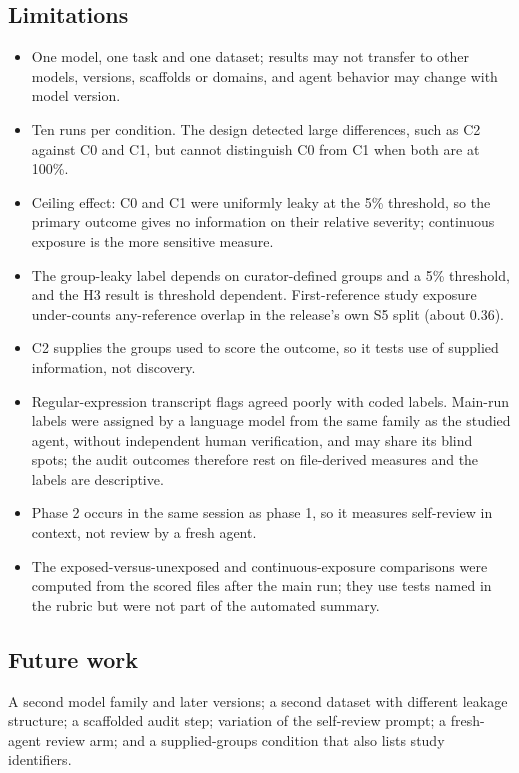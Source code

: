 \documentclass[11pt,a4paper]{article}
\begin{document}
\subsection*{Limitations}
\begin{itemize}
\item One model, one task and one dataset; results may not transfer to other models, versions, scaffolds or domains, and agent behavior may change with model version.
\item Ten runs per condition. The design detected large differences, such as C2 against C0 and C1, but cannot distinguish C0 from C1 when both are at 100\%.
\item Ceiling effect: C0 and C1 were uniformly leaky at the 5\% threshold, so the primary outcome gives no information on their relative severity; continuous exposure is the more sensitive measure.
\item The group-leaky label depends on curator-defined groups and a 5\% threshold, and the H3 result is threshold dependent. First-reference study exposure under-counts any-reference overlap in the release's own S5 split (about 0.36).
\item C2 supplies the groups used to score the outcome, so it tests use of supplied information, not discovery.
\item Regular-expression transcript flags agreed poorly with coded labels. Main-run labels were assigned by a language model from the same family as the studied agent, without independent human verification, and may share its blind spots; the audit outcomes therefore rest on file-derived measures and the labels are descriptive.
\item Phase 2 occurs in the same session as phase 1, so it measures self-review in context, not review by a fresh agent.
\item The exposed-versus-unexposed and continuous-exposure comparisons were computed from the scored files after the main run; they use tests named in the rubric but were not part of the automated summary.
\end{itemize}

\subsection*{Future work}
A second model family and later versions; a second dataset with different leakage structure; a scaffolded audit step; variation of the self-review prompt; a fresh-agent review arm; and a supplied-groups condition that also lists study identifiers.
\end{document}
